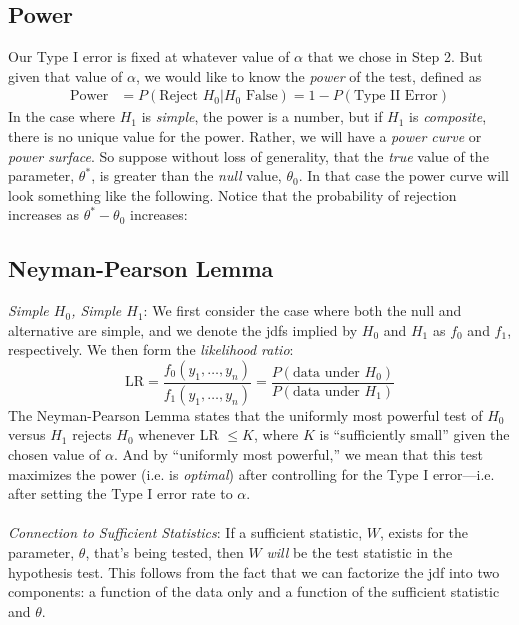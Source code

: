 \documentclass[12pt]{article}
\theoremstyle{plain}
\theoremstyle{definition}
\theoremstyle{remark}
\begin{document}
\subsection{Power}

Our Type I error is fixed at whatever value of $\alpha$ that we
chose in Step 2. But given that value of $\alpha$, we would like
to know the \emph{power} of the test, defined as
\begin{align*}
   \text{Power} &= P(\text{Reject $H_0$} | H_0 \text{ False})
   =1 - P(\text{Type II Error})
\end{align*}
In the case where $H_1$ is \emph{simple}, the
power is a number, but if $H_1$ is \emph{composite}, there is
no unique value for the power.  Rather, we will have a
\emph{power curve}
or \emph{power surface}. So suppose without loss
of generality, that the \emph{true} value of the parameter, $\theta^*$,
is greater than the \emph{null} value, $\theta_0$.
In that case the power curve
will look something like the following.
Notice that the probability of rejection increases as
$\theta^*-\theta_0$ increases:

\subsection{Neyman-Pearson Lemma}

{\sl Simple $H_0$, Simple $H_1$}: We first consider the case where
both the null and alternative are simple, and we denote the jdfs
implied by $H_0$ and $H_1$ as $f_0$ and $f_1$, respectively. We
then form the \emph{likelihood ratio}:
\[ \text{LR} = \frac{f_0(y_1, \ldots, y_n)}{f_1(y_1, \ldots, y_n)}=
   \frac{P(\text{data under $H_0$})}{P(\text{data under $H_1$})}
   \]
The Neyman-Pearson Lemma states that the uniformly most powerful
test of $H_0$ versus $H_1$ rejects $H_0$ whenever LR $\leq K$,
where $K$ is ``sufficiently small'' given the chosen value of $\alpha$.
And by ``uniformly most powerful,'' we mean that this test
maximizes the power (i.e. is \emph{optimal})
after controlling for the Type I error---i.e.
after setting the Type I error rate to $\alpha$.
\\
\\
{\sl Connection to Sufficient Statistics}: If a sufficient statistic,
$W$, exists for the parameter, $\theta$, that's being tested, then
$W$ \emph{will} be the test statistic in the hypothesis test. This
follows from the fact that we can factorize the jdf into two
components: a function of the data only and a function of the sufficient
statistic and $\theta$.
\end{document}

